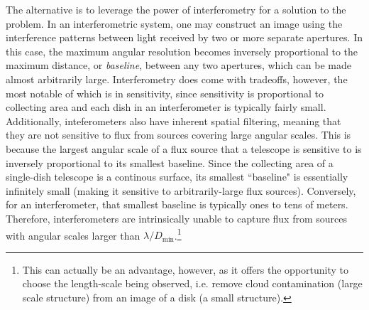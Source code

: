 The alternative is to leverage the power of interferometry for a solution to the problem. In an interferometric system, one may construct an image using the interference patterns between light received by two or more separate apertures. In this case, the maximum angular resolution becomes inversely proportional to the maximum distance, or \textit{baseline}, between any two  apertures, which can be made almost arbitrarily large. Interferometry does come with tradeoffs, however, the most notable of which is in sensitivity, since sensitivity is proportional to collecting area and each dish in an interferometer is typically fairly small. Additionally, inteferometers also have inherent spatial filtering, meaning that they are not sensitive to flux from sources covering large angular scales. This is because the largest angular scale of a flux source that a telescope is sensitive to is inversely proportional to its smallest baseline. Since the collecting area of a single-dish telescope is a continous surface, its smallest ``baseline" is essentially infinitely small (making it sensitive to arbitrarily-large flux sources). Conversely, for an interferometer, that smallest baseline is typically ones to tens of meters. Therefore, interferometers are intrinsically unable to capture flux from sources with angular scales larger than $\lambda/D_\text{min}$.\footnote{This can actually be an advantage, however, as it offers the opportunity to choose the length-scale being observed, i.e. remove cloud contamination (large scale structure) from an image of a disk (a small structure).}







